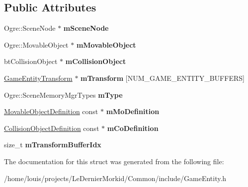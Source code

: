 \subsection*{Public Attributes}
\begin{DoxyCompactItemize}
\item 
\mbox{\label{struct_common_1_1_game_entity_ad6d1c510b4eb3e83e26c2fe78f5ea55c}} 
Ogre\+::\+Scene\+Node $\ast$ {\bfseries m\+Scene\+Node}
\item 
\mbox{\label{struct_common_1_1_game_entity_aa7394d089e8ddccaeaafd06ced6d2b54}} 
Ogre\+::\+Movable\+Object $\ast$ {\bfseries m\+Movable\+Object}
\item 
\mbox{\label{struct_common_1_1_game_entity_afa2c88a6b49500a16cba74721a099b84}} 
bt\+Collision\+Object $\ast$ {\bfseries m\+Collision\+Object}
\item 
\mbox{\label{struct_common_1_1_game_entity_a36dc8cb7923177eb631dc333e37e22f9}} 
\hyperlink{struct_common_1_1_game_entity_transform}{Game\+Entity\+Transform} $\ast$ {\bfseries m\+Transform} \mbox{[}N\+U\+M\+\_\+\+G\+A\+M\+E\+\_\+\+E\+N\+T\+I\+T\+Y\+\_\+\+B\+U\+F\+F\+E\+RS\mbox{]}
\item 
\mbox{\label{struct_common_1_1_game_entity_a8d91c6cbb06d2c46d2b07b1461b62371}} 
Ogre\+::\+Scene\+Memory\+Mgr\+Types {\bfseries m\+Type}
\item 
\mbox{\label{struct_common_1_1_game_entity_a7e663e00167ef9bf306c474988c949cd}} 
\hyperlink{struct_common_1_1_movable_object_definition}{Movable\+Object\+Definition} const  $\ast$ {\bfseries m\+Mo\+Definition}
\item 
\mbox{\label{struct_common_1_1_game_entity_a87c7617ad8a3dcdd6dd424cca9fb1079}} 
\hyperlink{struct_common_1_1_collision_object_definition}{Collision\+Object\+Definition} const  $\ast$ {\bfseries m\+Co\+Definition}
\item 
\mbox{\label{struct_common_1_1_game_entity_a52127ea487808c64d5e974d2fefcd49b}} 
size\+\_\+t {\bfseries m\+Transform\+Buffer\+Idx}
\end{DoxyCompactItemize}


The documentation for this struct was generated from the following file\+:\begin{DoxyCompactItemize}
\item 
/home/louis/projects/\+Le\+Dernier\+Morkid/\+Common/include/Game\+Entity.\+h\end{DoxyCompactItemize}
